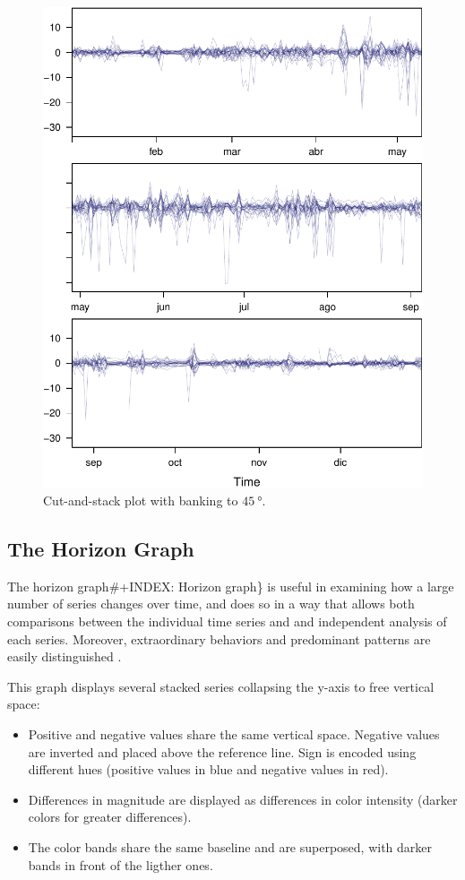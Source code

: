 \begin{figure}[htbp]
\centering
\includegraphics[width=.9\linewidth]{figs/navarraBanking.pdf}
\caption{Cut-and-stack plot with banking to \(\SI{45}{\degree}\). \label{fig:navarraBanking}}
\end{figure}

\subsection{The Horizon Graph \label{sec:horizonplot}}
\label{sec:org0416174}
The horizon graph\#+INDEX: Horizon graph\} is useful in examining how a
large number of series changes over time, and does so in a way
that allows both comparisons between the individual time series
and and independent analysis of each series. Moreover,
extraordinary behaviors and predominant patterns are easily
distinguished \cite{Heer.Kong.ea2009,Few2008}.

This graph displays several stacked series collapsing the y-axis
to free vertical space:
\begin{itemize}
\item Positive and negative values share the same vertical
space. Negative values are inverted and placed above the
reference line. Sign is encoded using different hues (positive
values in blue and negative values in red).
\item Differences in magnitude are displayed as differences in color
intensity (darker colors for greater differences).
\item The color bands share the same baseline and are superposed, with
darker bands in front of the ligther ones.
\end{itemize}


